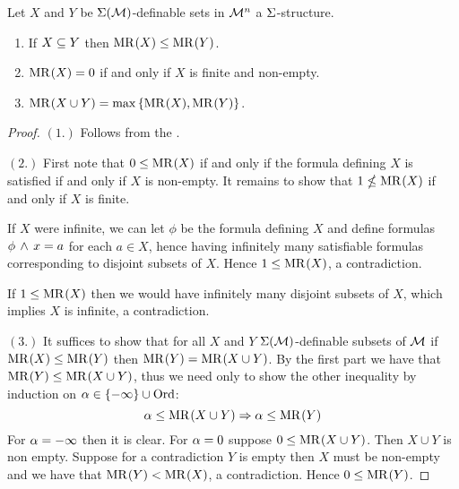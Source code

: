 \begin{prop}
    Let $X$ and $Y$ be $\Sigma(\mathcal{M})$-definable sets in $\mathcal{M}^n$ a $\Sigma$-structure.
    \begin{enumerate}
        \item If $X \subseteq Y$ then $\mathrm{MR}^{}(X) \leq \mathrm{MR}^{}(Y)$.
        \item $\mathrm{MR}^{}(X) = 0$ if and only if $X$ is finite and non-empty.
        \item $\mathrm{MR}^{}(X \cup Y) = \max \left\{\mathrm{MR}^{}(X), \mathrm{MR}^{}(Y)\right\}$.
    \end{enumerate}
\end{prop}
\begin{proof}
    $(1.)$ Follows from the .

    $(2.)$ First note that $0 \leq \mathrm{MR}^{}(X)$ if and only if the 
    formula defining $X$ is satisfied if and only if $X$ is non-empty.
    It remains to show that $1 \nleq \mathrm{MR}^{}(X)$ if and only if 
    $X$ is finite.
    \begin{forward}
        If $X$ were infinite, we can let $\phi$ be the formula defining $X$ and 
        define formulas $\phi \, \land \, x = a$ for each $a \in X$,
        hence having infinitely many satisfiable formulas corresponding to
        disjoint subsets of $X$.
        Hence $1 \leq \mathrm{MR}^{}(X)$, a contradiction.
    \end{forward}

    \begin{backward}
        If $1 \leq \mathrm{MR}^{}(X)$ then we would have infinitely many disjoint
        subsets of $X$, which implies $X$ is infinite, a contradiction.
    \end{backward}

    $(3.)$ It suffices to show that for all $X$ and $Y$ 
    $\Sigma(\mathcal{M})$-definable subsets of $\mathcal{M}$
    if $\mathrm{MR}^{}(X) \leq \mathrm{MR}^{}(Y)$ then $\mathrm{MR}^{}(Y) = \mathrm{MR}^{}(X \cup Y)$.
    By the first part we have that $\mathrm{MR}^{}(Y) \leq \mathrm{MR}^{}(X \cup Y)$,
    thus we need only to show the other inequality by induction on 
    $\alpha \in \left\{-\infty\right\} \cup \operatorname{Ord}$:
    \[\alpha \leq \mathrm{MR}^{}(X \cup Y) \Rightarrow \alpha \leq \mathrm{MR}^{}(Y)\]
    For $\alpha = - \infty$ then it is clear.
    For $\alpha = 0$ suppose $0 \leq \mathrm{MR}^{}(X \cup Y)$. 
    Then $X \cup Y$ is non empty.
    Suppose for a contradiction $Y$ is empty then $X$ must be non-empty
    and we have that $\mathrm{MR}^{}(Y) < \mathrm{MR}^{}(X)$, a contradiction.
    Hence $0 \leq \mathrm{MR}^{}(Y)$.


\end{proof}
